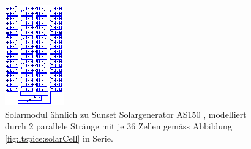 \begin{figure}[h!tb]
    \centering
    \includegraphics[width=\textwidth]{images/ltspice/module-72cells.eps}
    \caption{%
        Solarmodul     \"ahnlich     zu    Sunset     Solargenerator     AS150
        \cite{ref:solar:as150}, modelliert durch 2  parallele Str\"ange mit je
        36 Zellen gem\"ass Abbildung \ref{fig:ltspice:solarCell} in Serie.%
    }
    \label{fig:ltspice:module:cellBased:36x2}
\end{figure}

